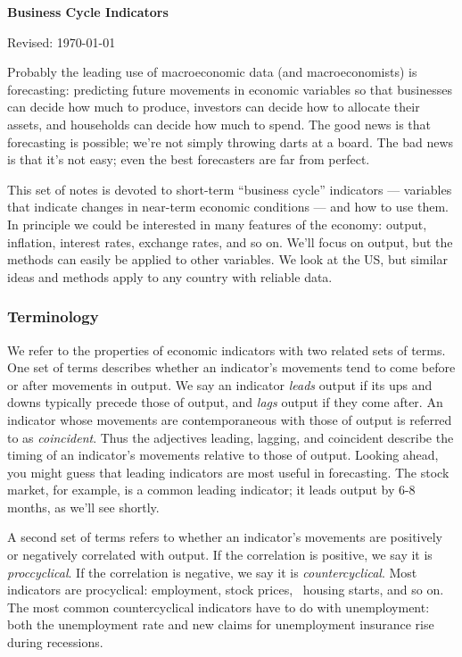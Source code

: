 \documentclass[letterpaper,12pt]{article}
\def\HeadName{Business Cycle Indicators}
\begin{document}
\thispagestyle{empty}%
\Head

\centerline{\large \bf \HeadName}%
\centerline{Revised: \today}

\bigskip
Probably the leading use of macroeconomic data (and macroeconomists)
is forecasting:  predicting future movements in economic variables
so that businesses can decide how much to produce,
investors can decide how to allocate their assets,
and households can decide how much to spend.
The good news is that forecasting is possible;
we're not simply throwing darts at a board.
The bad news is that it's not easy;
even the best forecasters are far from perfect.

This set of notes is devoted to short-term ``business cycle''
indicators ---
variables that indicate changes in near-term economic conditions ---
and how to use them.
In principle we could be interested in many features of
the economy:  output, inflation, interest rates,
exchange rates, and so on.
We'll focus on output, but the methods can easily be applied
to other variables.
We look at the US, but similar ideas and methods apply to
any country with reliable data.


\subsubsection*{Terminology}

We refer to the properties of economic indicators with two related sets of terms.
One set of terms
describes whether an indicator's movements
tend to come before or after movements in output.
We say an indicator {\it leads\/} output if
its ups and downs typically precede those of output,
and {\it lags\/} output if they come after.
An indicator whose movements are contemporaneous with those of output
is referred to as {\it coincident\/}.
Thus the adjectives leading, lagging, and  coincident
describe the timing of an indicator's movements relative to those of output.
Looking ahead, you might guess that leading indicators are
most useful in forecasting.
The stock market, for example, is a common leading indicator;
it leads output by 6-8 months, as we'll see shortly.


A second set of terms refers to
whether an indicator's movements
are positively or negatively correlated with output.
If the correlation is positive, we say it is {\it proccyclical\/}.
If the correlation is negative, we say it is {\it countercyclical\/}.
Most indicators are procyclical:  employment, stock prices, \
housing starts, and so on.
The most common countercyclical indicators have to do with unemployment:
 both the unemployment rate and new claims for unemployment insurance
 rise during recessions.
\end{document}
